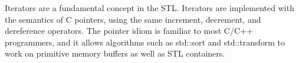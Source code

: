 Iterators are a fundamental concept in the STL. Iterators are implemented with the semantics of C pointers, using the same increment, decrement, and dereference operators. The pointer idiom is familiar to most C/C++ programmers, and it allows algorithms such as std::sort and std::transform to work on primitive memory buffers as well as STL containers.